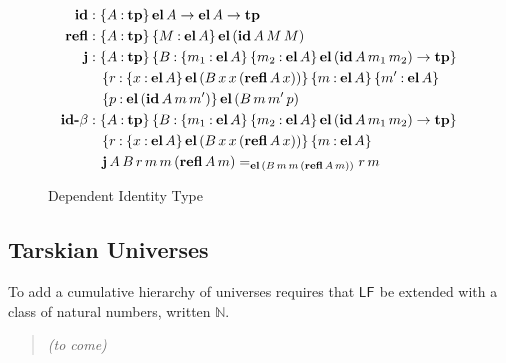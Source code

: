 \documentclass[11pt,twoside]{article}
\newcommand{\braces}[1]{\{#1\}}
\newcommand{\parens}[1]{(#1)}
\newcommand{\LF}[1][]{\ensuremath{\mathsf{LF}_{#1}}}
\newcommand{\eqclass}[3]{{#2}=_{#1}{#3}}
\newcommand{\piclass}[3]{\braces{{#2}\mathbin{:}{#1}}\,{#3}}
\newcommand{\arrclass}[2]{{#1}\to{#2}}
\newcommand{\natclass}{\ensuremath{\mathbb{N}}}
\newcommand{\appobj}[2]{{#1}\,{#2}}
\begin{document}
\begin{figure}
  
  \begin{align*}
    \idcon & : \piclass{\tpsort}{A}{\arrclass{\elof{A}}{\arrclass{\elof{A}}{\tpsort}}} \\
    \reflcon & : \piclass{\tpsort}{A}{\piclass{\elof{A}}{M}{\elofp{\idof{A}{M}{M}}}} \\
    \jcon & :
            \piclass{\tpsort}{A}{
            \piclass{\piclass{\elof{A}}{m_{1}}{\piclass{\elof{A}}{m_{2}}{\arrclass{\elofp{\idof{A}{m_{1}}{m_{2}}}}{\tpsort}}}}{B}{
            }} \\
           & \quad
             \piclass{\piclass{\elof{A}}{x}{\elofp{\appobj{\appobj{\appobj{B}{x}}{x}}{\parens{\reflof{A}{x}}}}}}{r}{
             \piclass{\elof{A}}{m}{\piclass{\elof{A}}{m'}{
             }}} \\
             & \quad
               \piclass{\elofp{\idof{A}{m}{m'}}}{p}{\elofp{\appobj{\appobj{\appobj{B}{m}}{m'}}{p}}} \\
    \idbetacon & :
            \piclass{\tpsort}{A}{
            \piclass{\piclass{\elof{A}}{m_{1}}{\piclass{\elof{A}}{m_{2}}{\arrclass{\elofp{\idof{A}{m_{1}}{m_{2}}}}{\tpsort}}}}{B}{
            }} \\
           & \quad
             \piclass{\piclass{\elof{A}}{x}{\elofp{\appobj{\appobj{\appobj{B}{x}}{x}}{\parens{\reflof{A}{x}}}}}}{r}{
             \piclass{\elof{A}}{m}{
             }} \\
           & \quad
             \eqclass
             {\elofp{\appobj{\appobj{\appobj{B}{m}}{m}}{\parens{\reflof{A}{m}}}}}
             {\jof{A}{B}{r}{m}{m}{\parens{\reflof{A}{m}}}}
             {\appobj{r}{m}}
  \end{align*}

  \caption{Dependent Identity Type}
  \label{fig:dep-id}
\end{figure}

\subsection{Tarskian Universes}

To add a cumulative hierarchy of universes requires that \LF{} be extended with a class of
natural numbers, written $\natclass$.


\begin{quote}
  \textit{(to come)}
\end{quote}



\end{document}
